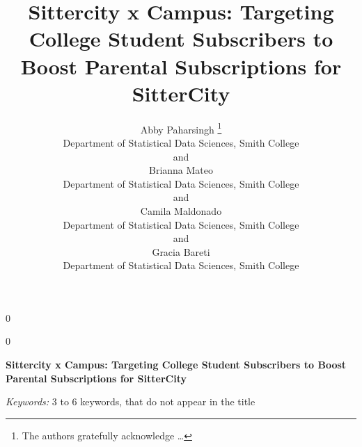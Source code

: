 \documentclass[12pt]{article}
\newcommand{\blind}{0}
\begin{document}
\def\spacingset#1{\renewcommand{\baselinestretch}%
{#1}\small\normalsize} \spacingset{1}



\blind
{
  \title{\bf Sittercity x Campus: Targeting College Student Subscribers
to Boost Parental Subscriptions for SitterCity}

  \author{
        Abby Paharsingh \thanks{The authors gratefully acknowledge
\ldots{}} \\
    Department of Statistical Data Sciences, Smith College\\
     and \\     Brianna Mateo \\
    Department of Statistical Data Sciences, Smith College\\
     and \\     Camila Maldonado \\
    Department of Statistical Data Sciences, Smith College\\
     and \\     Gracia Bareti \\
    Department of Statistical Data Sciences, Smith College\\
      }
  \maketitle
} \fi

\blind
{
  \bigskip
  \bigskip
  \bigskip
  \begin{center}
    {\LARGE\bf Sittercity x Campus: Targeting College Student
Subscribers to Boost Parental Subscriptions for SitterCity}
  \end{center}
  \medskip
} \fi

\bigskip

\noindent%
{\it Keywords:} 3 to 6 keywords, that do not appear in the title

\vfill

\newpage
\spacingset{1.9} %
\end{document}
